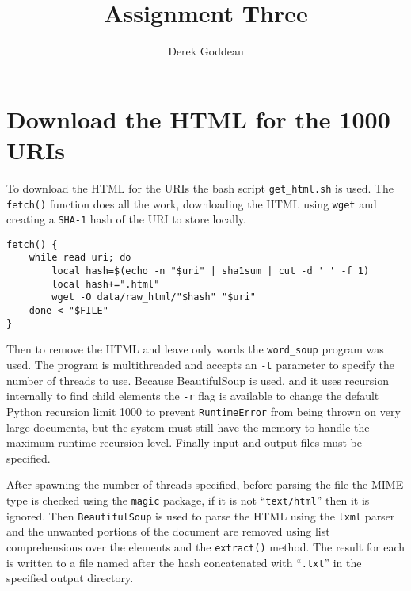 \documentclass[12pt, a4paper]{article}
\author{Derek Goddeau}
\title{Assignment Three}
\newcommand{\code}[1]{\texttt{#1}}
\begin{document}
\maketitle

\newpage



\section{Download the HTML for the 1000 URIs}

To download the HTML for the URIs the bash script \code{get\_html.sh}
is used. The \code{fetch()} function does all the work, downloading the
HTML using \code{wget} and creating a \code{SHA-1} hash of the URI
to store locally.

\begin{minipage}{\linewidth} %
\vspace{2em}
\begin{verbatim}
fetch() {
    while read uri; do
        local hash=$(echo -n "$uri" | sha1sum | cut -d ' ' -f 1)
        local hash+=".html"
        wget -O data/raw_html/"$hash" "$uri"
    done < "$FILE"
}
\end{verbatim}
\vspace{2em}
\end{minipage}

Then to remove the HTML and leave only words the \code{word\_soup}
program was used. The program is multithreaded and accepts an
\code{-t} parameter to specify the number of threads to use.
Because BeautifulSoup is used, and it uses recursion internally
to find child elements the \code{-r} flag is available to change
the default Python recursion limit 1000 to prevent \code{RuntimeError}
from being thrown on very large documents, but the system must still have
the memory to handle the maximum runtime recursion level. Finally
input and output files must be specified.

After spawning the number of threads specified,
before parsing the file the MIME type is checked using the
\code{magic} package, if it is not \enquote{\code{text/html}} then it is ignored.
Then \code{BeautifulSoup} is used to parse the HTML using the \code{lxml}
parser and the unwanted portions of the document are removed using
list comprehensions over the elements and the \code{extract()} method.
The result for each is written to a file named after the hash concatenated
with \enquote{\code{.txt}} in the specified output directory.
\end{document}

